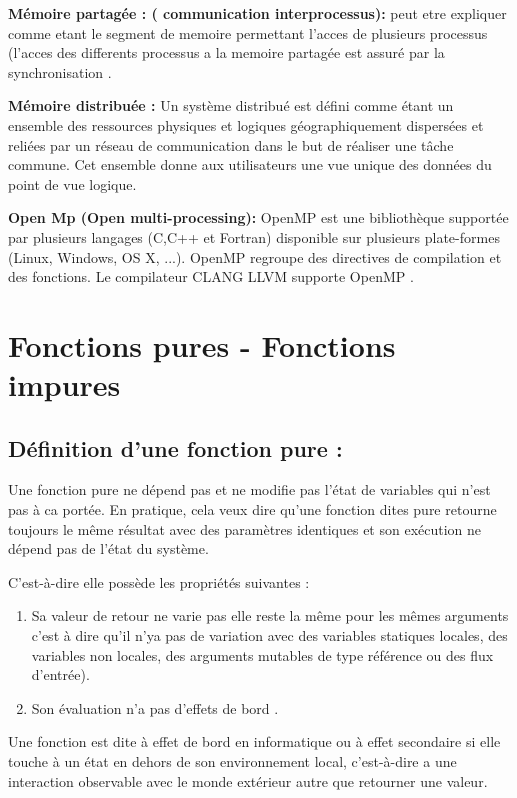 \documentclass[12pt,titlepage]{article}
\begin{document}
\textbf{ Mémoire partagée : ( communication interprocessus): }  peut etre expliquer comme etant le segment de memoire permettant l'acces de plusieurs processus (l'acces des differents processus a la memoire partagée est assuré par la synchronisation .\cite{wiki}

\textbf{ Mémoire distribuée : } Un système distribué est défini comme étant un ensemble des ressources physiques et logiques géographiquement dispersées et reliées par un réseau de communication dans le but de réaliser une tâche commune. Cet ensemble donne aux utilisateurs une vue unique des données du point de vue logique.\cite{wiki}

\textbf{ Open Mp (Open multi-processing):} OpenMP est une bibliothèque supportée par plusieurs langages (C,C++ et Fortran) disponible sur plusieurs plate-formes (Linux, Windows, OS X, ...). OpenMP regroupe des directives de compilation et des fonctions. Le compilateur CLANG LLVM supporte OpenMP .\cite{open}

\section{Fonctions pures - Fonctions impures}


\subsection{Définition d’une fonction pure :}

Une fonction pure ne dépend pas et ne modifie pas l'état de variables qui n'est pas à ca portée.
En pratique, cela veux dire qu'une fonction dites pure retourne toujours le même résultat avec des paramètres identiques et son exécution ne dépend pas de l’état du système.

C'est-à-dire elle possède  les propriétés suivantes  :

\begin{enumerate}
	\item Sa valeur de retour ne varie pas elle reste la même pour les mêmes arguments c'est à dire qu'il n'ya pas de variation avec des variables statiques locales, des variables non locales, des arguments mutables de type référence ou des flux d'entrée).

	\item Son évaluation n'a pas d'effets de bord \cite{definitionfctpure}.

\end{enumerate}


Une fonction est dite à effet de bord en informatique ou à effet secondaire si elle touche à un état en dehors de son environnement local, c'est-à-dire a une interaction observable avec le monde extérieur autre que retourner une valeur.
\end{document}
